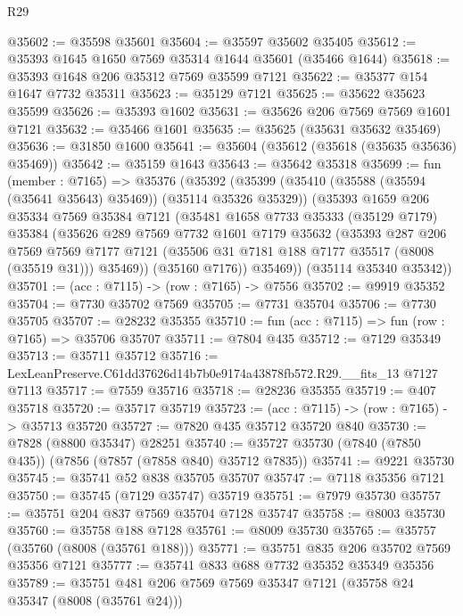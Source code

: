 \begin{lexlean}{R29}
\begin{coremodule}
@35602 := @35598 @35601
@35604 := @35597 @35602 @35405
@35612 := @35393 @1645 @1650 @7569 @35314 @1644 @35601 (@35466 @1644)
@35618 := @35393 @1648 @206 @35312 @7569 @35599 @7121
@35622 := @35377 @154 @1647 @7732 @35311
@35623 := @35129 @7121
@35625 := @35622 @35623 @35599
@35626 := @35393 @1602
@35631 := @35626 @206 @7569 @7569 @1601 @7121
@35632 := @35466 @1601
@35635 := @35625 (@35631 @35632 @35469)
@35636 := @31850 @1600
@35641 := @35604 (@35612 (@35618 (@35635 @35636) @35469))
@35642 := @35159 @1643
@35643 := @35642 @35318
@35699 := fun (member : @7165) =>
  @35376
    (@35392
      (@35399
        (@35410 (@35588 (@35594 (@35641 @35643) @35469)) (@35114 @35326 @35329))
        (@35393
          @1659
          @206
          @35334
          @7569
          @35384
          @7121
          (@35481
            @1658
            @7733
            @35333
            (@35129 @7179)
            @35384
            (@35626
              @289
              @7569
              @7732
              @1601
              @7179
              @35632
              (@35393
                @287
                @206
                @7569
                @7569
                @7177
                @7121
                (@35506 @31 @7181 @188 @7177 @35517 (@8008 (@35519 @31)))
                @35469))
            (@35160 @7176))
          @35469))
      (@35114 @35340 @35342))
@35701 := (acc : @7115) -> (row : @7165) -> @7556
@35702 := @9919 @35352
@35704 := @7730 @35702 @7569
@35705 := @7731 @35704
@35706 := @7730 @35705
@35707 := @28232 @35355
@35710 := fun (acc : @7115) => fun (row : @7165) => @35706 @35707
@35711 := @7804 @435
@35712 := @7129 @35349
@35713 := @35711 @35712
@35716 := LexLeanPreserve.C61dd37626d14b7b0e9174a43878fb572.R29.__fits_13 @7127 @7113
@35717 := @7559 @35716
@35718 := @28236 @35355
@35719 := @407 @35718
@35720 := @35717 @35719
@35723 := (acc : @7115) -> (row : @7165) -> @35713 @35720
@35727 := @7820 @435 @35712 @35720 @840
@35730 := @7828 (@8800 @35347) @28251
@35740 := @35727 @35730 (@7840 (@7850 @435)) (@7856 (@7857 (@7858 @840) @35712 @7835))
@35741 := @9221 @35730
@35745 := @35741 @52 @838 @35705 @35707
@35747 := @7118 @35356 @7121
@35750 := @35745 (@7129 @35747) @35719
@35751 := @7979 @35730
@35757 := @35751 @204 @837 @7569 @35704 @7128 @35747
@35758 := @8003 @35730
@35760 := @35758 @188 @7128
@35761 := @8009 @35730
@35765 := @35757 (@35760 (@8008 (@35761 @188)))
@35771 := @35751 @835 @206 @35702 @7569 @35356 @7121
@35777 := @35741 @833 @688 @7732 @35352 @35349 @35356
@35789 := @35751 @481 @206 @7569 @7569 @35347 @7121 (@35758 @24 @35347 (@8008 (@35761 @24)))

\end{coremodule}
\end{lexlean}
